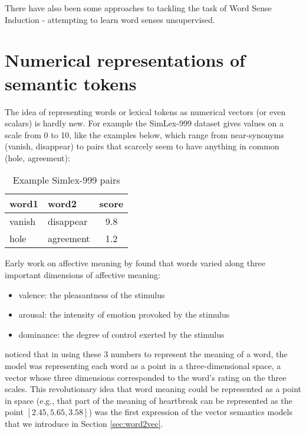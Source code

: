 There have also been some approaches to tackling the task of Word Sense Induction - attempting to learn word senses unsupervised.


\section{Numerical representations of semantic tokens}
The idea of representing words or lexical tokens as numerical vectors (or even scalars) is hardly new. 
For example the SimLex-999 dataset \citep*{hill-etal-2015-simlex} gives values on a scale from 0 to 10, like the examples below, which range from near-synonyms (vanish, disappear) to pairs that scarcely seem to have anything in common (hole, agreement):

\begin{table}[htbp]
    \centering
        \begin{tabular}{llc}
            \toprule
            word1 & word2 & score \\
            \midrule
            vanish & disappear & 9.8 \\
            hole & agreement & 1.2 \\
            \bottomrule
       \end{tabular}
    \caption{Example Simlex-999 pairs}
    \label{simlex2pairs}
\end{table}


Early work on affective meaning by \cite{osgood1957measurement} found that words varied along three important dimensions of affective meaning:
\begin{itemize}
    \item valence: the pleasantness of the stimulus
    \item arousal: the intensity of emotion provoked by the stimulus
    \item dominance: the degree of control exerted by the stimulus
\end{itemize}

\cite{osgood1957measurement} noticed that in using these 3 numbers to represent the meaning of a word, the model was representing each word as a point in a three-dimensional space, a vector whose three dimensions corresponded to the word’s rating on the three scales. This revolutionary idea that word meaning could be represented as a point in space (e.g., that part of the meaning of heartbreak can be represented as the point $[2.45,5.65,3.58]$) was the first expression of the vector semantics models that we introduce in Section \ref{sec:word2vec}.

